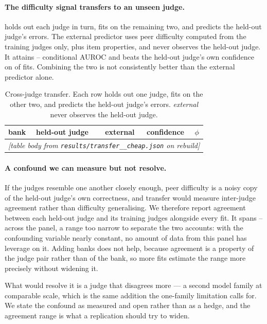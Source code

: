 \documentclass{article}
\begin{document}
\paragraph{The difficulty signal transfers to an unseen judge.}  holds out each
judge in turn, fits on the remaining two, and predicts the held-out judge's errors. The external
predictor uses peer difficulty computed from the training judges only, plus item properties, and
never observes the held-out judge. It attains \TransferExtLo{}--\TransferExtHi{} conditional AUROC
and beats the held-out judge's own confidence on \TransferExtBeatsMargin{} of \TransferN{} fits.
Combining the two is not consistently better than the external predictor alone.

\begin{table}[h]
\centering\small
\caption{Cross-judge transfer. Each row holds out one judge, fits on the other two, and predicts
the held-out judge's errors. \emph{external} never observes the held-out judge.}
\label{tab:transfer}
\begin{tabular}{llccc}
\toprule
bank & held-out judge & external & confidence & $\phi$ \\
\midrule
\multicolumn{5}{l}{\emph{[table body from \texttt{results/transfer\_\_cheap.json} on rebuild]}} \\
\bottomrule
\end{tabular}
\end{table}

\paragraph{A confound we can measure but not resolve.} If the judges resemble one another closely
enough, peer difficulty is a noisy copy of the held-out judge's own correctness, and transfer would
measure inter-judge agreement rather than difficulty generalising. We therefore report agreement
between each held-out judge and its training judges alongside every fit. It spans
\AgreeLo{}--\AgreeHi{} across the panel, a range too narrow to separate the two accounts: with the
confounding variable nearly constant, no amount of data from this panel has leverage on it. Adding
banks does not help, because agreement is a property of the judge pair rather than of the bank, so
more fits estimate the range more precisely without widening it.

What would resolve it is a judge that disagrees more --- a second model family at comparable scale,
which is the same addition the one-family limitation calls for. We state the confound as measured
and open rather than as a hedge, and the agreement range is what a replication should try to widen.
\end{document}
